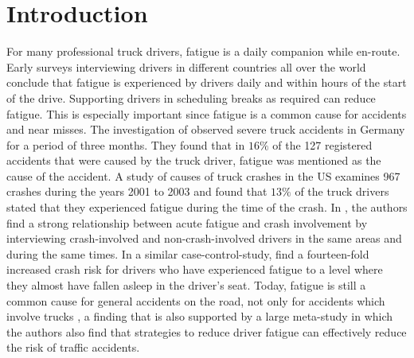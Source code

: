 
\chapter{Introduction\label{ch:introduction}}

For many professional truck drivers, fatigue is a daily companion while en-route. Early surveys \cite{williamson:2001, adams-guppy:2003} interviewing drivers in different countries all over the world conclude that fatigue is experienced by drivers daily and within hours of the start of the drive. Supporting drivers in scheduling breaks as required can reduce fatigue. This is especially important since fatigue is a common cause for accidents and near misses. The investigation of \cite{evers:2005} observed severe truck accidents in Germany for a period of three months. They found that in $16\%$ of the 127 registered accidents that were caused by the truck driver, fatigue was mentioned as the cause of the accident. A study of causes of truck crashes in the US \cite{federalmotorcarriersafetyadministrationfmcsa:2006} examines 967 crashes during the years 2001 to 2003 and found that $13\%$ of the truck drivers stated that they experienced fatigue during the time of the crash. In \cite{connor:2001}, the authors find a strong relationship between acute fatigue and crash involvement by interviewing crash-involved and non-crash-involved drivers in the same areas and during the same times. In a similar case-control-study, \cite{cummings:2001} find a fourteen-fold increased crash risk for drivers who have experienced fatigue to a level where they almost have fallen asleep in the driver's seat. Today, fatigue is still a common cause for general accidents on the road, not only for accidents which involve trucks \cite{statistischesbundesamtdestatis:2021}, a finding that is also supported by a large meta-study \cite{moradi:2019} in which the authors also find that strategies to reduce driver fatigue can effectively reduce the risk of traffic accidents.

